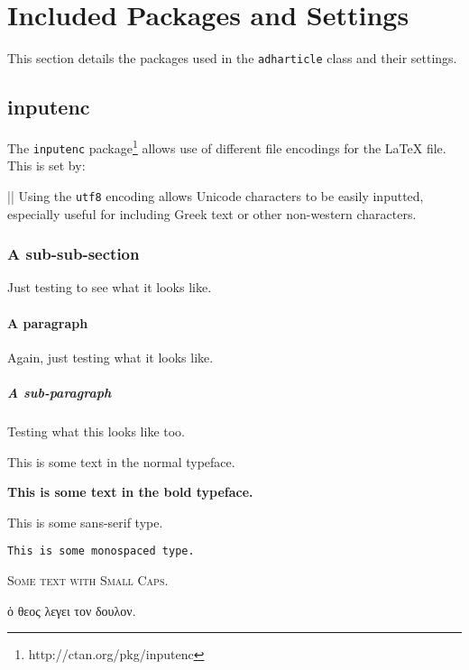 \documentclass[electronic,timesopt,headers]{adharticle} %
\begin{document}

\section{Included Packages and Settings}


This section details the packages used in the \texttt{adharticle} class and
their settings.

\subsection{inputenc}

The \texttt{inputenc} package\footnote{http://ctan.org/pkg/inputenc} allows use
of different file encodings for the LaTeX file. This is set by:

\latex|\RequirePackage[utf8]{inputenc}|
Using the \texttt{utf8} encoding allows Unicode characters to be easily
inputted, especially useful for including Greek text or other non-western
characters.

\subsubsection{A sub-sub-section}

Just testing to see what it looks like.

\paragraph{A paragraph}

Again, just testing what it looks like.

\subparagraph{A sub-paragraph}

Testing what this looks like too.

This is some text in the normal typeface.

\textbf{This is some text in the bold typeface.}

\textsf{This is some sans-serif type.}

\texttt{This is some monospaced type.}

\textsc{Some text with Small Caps.}


ὁ θεος λεγει τον δουλον.

\end{document}
